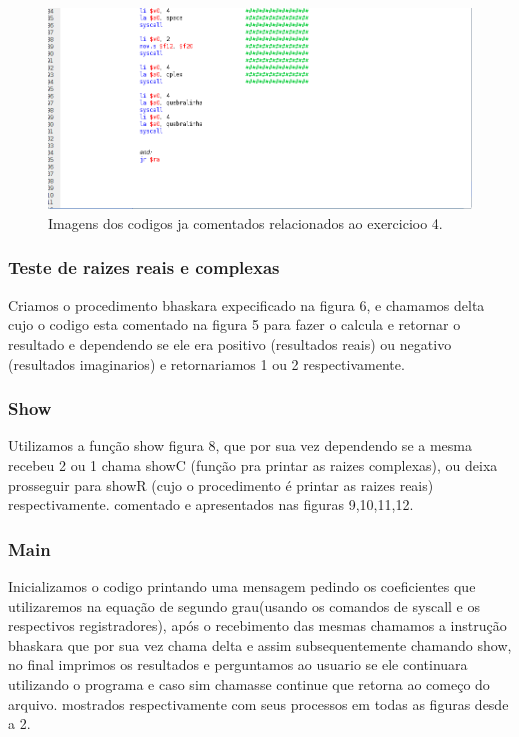 \documentclass[12pt]{article}
\begin{document}
\begin{figure}[H]
	\centering
	\includegraphics[width=1\textwidth]{EX_4_12.png}
	\caption{Imagens dos codigos ja comentados relacionados ao exercicioo 4.}
	\label{fig:hilo}
\end{figure}

\subsubsection{Teste de raizes reais e complexas}
\label{subsubsec:testebhas}

Criamos o procedimento bhaskara expecificado na figura 6, e chamamos delta cujo o codigo esta comentado na figura 5 para fazer o calcula e retornar o resultado e dependendo se ele era positivo (resultados reais) ou negativo (resultados imaginarios) e retornariamos 1 ou 2 respectivamente. 

\subsubsection{Show}
\label{subsubsec:show}

Utilizamos a função show figura 8, que por sua vez dependendo se a mesma recebeu 2 ou 1 chama showC (função pra printar as raizes complexas), ou deixa prosseguir para showR (cujo o procedimento é printar as raizes reais) respectivamente. comentado e apresentados nas figuras 9,10,11,12. 

\subsubsection{Main}
\label{subsubsec:Main}

Inicializamos o codigo printando uma mensagem pedindo os coeficientes que utilizaremos na equação de segundo grau(usando os comandos de syscall e os respectivos registradores), após o recebimento das mesmas chamamos a instrução bhaskara que por sua vez chama delta e assim subsequentemente chamando show, no final imprimos os resultados e perguntamos ao usuario se ele continuara utilizando o programa e caso sim chamasse continue que retorna ao começo do arquivo. mostrados respectivamente com seus processos em todas as figuras desde a 2.
 
\end{document}
